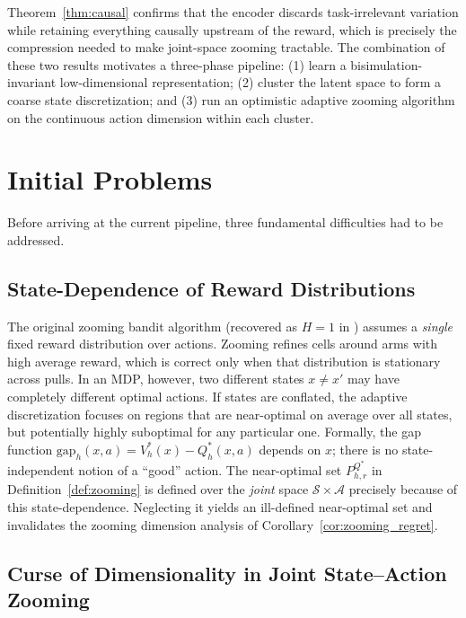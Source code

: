 \documentclass{article}
\begin{document}
Theorem~\ref{thm:causal} confirms that the encoder discards task-irrelevant variation
while retaining everything causally upstream of the reward, which is precisely the
compression needed to make joint-space zooming tractable. The combination of these
two results motivates a three-phase pipeline: (1) learn a bisimulation-invariant
low-dimensional representation; (2) cluster the latent space to form a coarse state
discretization; and (3) run an optimistic adaptive zooming algorithm on the continuous
action dimension within each cluster.

\section{Initial Problems}

Before arriving at the current pipeline, three fundamental difficulties had to be
addressed.

\subsection{State-Dependence of Reward Distributions}

The original zooming bandit algorithm (recovered as $H=1$ in \citet{cao2021}) assumes
a \emph{single} fixed reward distribution over actions. Zooming refines cells around
arms with high average reward, which is correct only when that distribution is
stationary across pulls. In an MDP, however, two different states $x \ne x'$ may have
completely different optimal actions. If states are conflated, the adaptive
discretization focuses on regions that are near-optimal on average over all states, but
potentially highly suboptimal for any particular one. Formally, the gap function
$\mathrm{gap}_h(x,a) = V_h^*(x) - Q_h^*(x,a)$ depends on $x$; there is no
state-independent notion of a ``good'' action. The near-optimal set
$P^{Q^*}_{h,r}$ in Definition~\ref{def:zooming} is defined over the \emph{joint}
space $\mathcal{S} \times \mathcal{A}$ precisely because of this state-dependence.
Neglecting it yields an ill-defined near-optimal set and invalidates the zooming
dimension analysis of Corollary~\ref{cor:zooming_regret}.

\subsection{Curse of Dimensionality in Joint State--Action Zooming}
\end{document}
